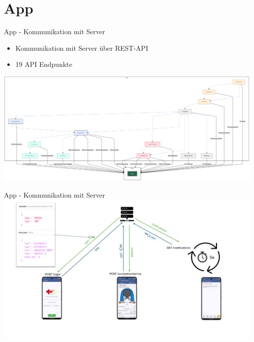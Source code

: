 %
%
\section{App}

\begin{frame}{App - Kommunikation mit Server}
	\begin{itemize}
		\item Kommunikation mit Server über REST-API
		\item 19 API Endpunkte
	\end{itemize}
	\centering
	\includegraphics[width=1.0\textwidth]{images/app/server_endpoints.png}
\end{frame}

\begin{frame}{App - Kommunikation mit Server}
	\centering
	\includegraphics[width=1.0\textwidth]{images/app/api_flow.png}
\end{frame}

